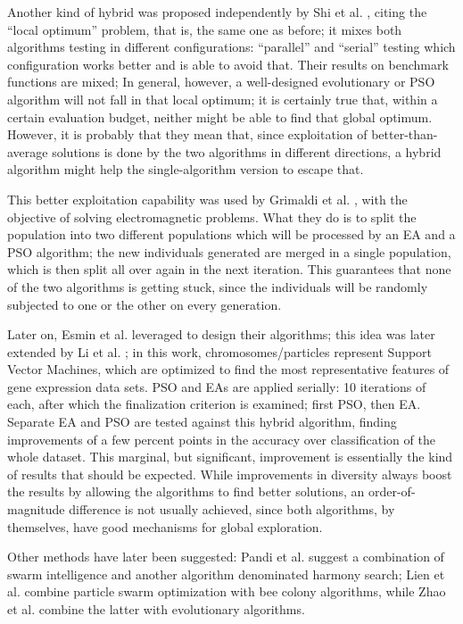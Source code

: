 \documentclass[runningheads]{llncs}
\begin{document}
Another kind of hybrid was proposed independently by
Shi et al. \cite{shi2003hybrid}, citing the ``local optimum'' problem,
that is, the same one as before; it mixes both algorithms
testing in different configurations: ``parallel'' and ``serial''
testing which configuration works better and is able to avoid
that. Their results on benchmark functions are mixed;
In general, however, a well-designed evolutionary or PSO
algorithm will not fall in that local optimum; it is certainly true
that, within a certain evaluation budget, neither might be able to
find that global optimum. However, it is probably that they mean that,
since exploitation of better-than-average solutions is done by the two
algorithms in different directions, a hybrid algorithm might help the
single-algorithm version to escape that.

This better exploitation capability was used by Grimaldi et al.
\cite{grimaldi2005genetical}, with the objective of solving
electromagnetic problems. What they do is
to split the population into two different populations which will be
processed by an EA and a PSO algorithm; the new individuals generated
are merged in a single population, which is then split all over again
in the next iteration. This guarantees that none of the two algorithms
is getting stuck, since the individuals will be randomly subjected to
one or the other on every generation.

Later on, Esmin et al. \cite{esmin2006hybrid} leveraged to design their
algorithms; this idea was
later extended by Li et al. \cite{li2008gene}; in this work,
chromosomes/particles represent Support Vector Machines, which are
optimized to find the most representative features of gene expression
data sets. PSO and EAs are applied serially: 10 iterations of each,
after which the finalization criterion is examined; first PSO, then
EA. Separate EA and PSO are tested against this hybrid algorithm,
finding improvements of a few percent points in the accuracy over
classification of the whole dataset. This marginal, but significant,
improvement is essentially the kind of results that should be
expected. While improvements in diversity always boost the results by
allowing the algorithms to find better solutions, an
order-of-magnitude difference is not usually  achieved, since both
algorithms, by themselves, have good mechanisms for global
exploration.

Other methods have later been suggested: Pandi et al. \cite{pandi2011dynamic}
suggest a combination of swarm intelligence and another algorithm
denominated harmony search; Lien et al. \cite{lien2012hybrid} combine
particle swarm optimization with bee colony algorithms, while Zhao et
al. \cite{zhao2010hybrid} combine the latter with evolutionary
algorithms. 
\end{document}
